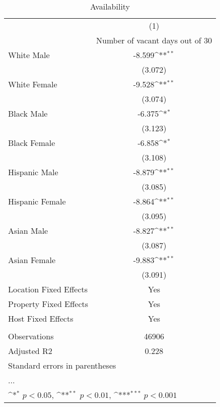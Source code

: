\begin{table}[htbp]\centering
\def\sym#1{\ifmmode^{#1}\else\(^{#1}\)\fi}
\caption{Availability}
\begin{tabular}{l*{1}{c}}
\hline\hline
                    &\multicolumn{1}{c}{(1)}\\
                    &\multicolumn{1}{c}{Number of vacant days out of 30}\\
\hline
White Male          &      -8.599\sym{**} \\
                    &     (3.072)         \\
[1em]
White Female        &      -9.528\sym{**} \\
                    &     (3.074)         \\
[1em]
Black Male          &      -6.375\sym{*}  \\
                    &     (3.123)         \\
[1em]
Black Female        &      -6.858\sym{*}  \\
                    &     (3.108)         \\
[1em]
Hispanic Male       &      -8.879\sym{**} \\
                    &     (3.085)         \\
[1em]
Hispanic Female     &      -8.864\sym{**} \\
                    &     (3.095)         \\
[1em]
Asian Male          &      -8.827\sym{**} \\
                    &     (3.087)         \\
[1em]
Asian Female        &      -9.883\sym{**} \\
                    &     (3.091)         \\
\hline
Location Fixed Effects&         Yes         \\
Property Fixed Effects&         Yes         \\
Host Fixed Effects  &         Yes         \\
\hline \vspace{-1.25em}&                     \\
Observations        &       46906         \\
Adjusted R2         &       0.228         \\
\hline\hline
\multicolumn{2}{l}{\footnotesize Standard errors in parentheses}\\
\multicolumn{2}{l}{\footnotesize ...}\\
\multicolumn{2}{l}{\footnotesize \sym{*} \(p<0.05\), \sym{**} \(p<0.01\), \sym{***} \(p<0.001\)}\\
\end{tabular}
\end{table}
